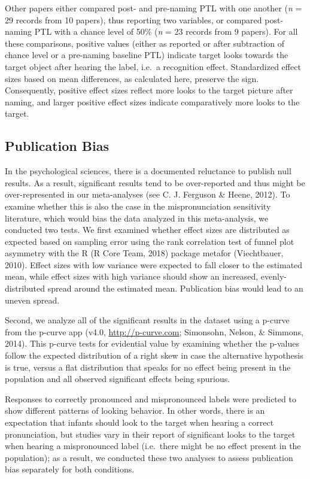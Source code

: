 \documentclass[man]{apa6}
\theoremstyle{definition}
\theoremstyle{definition}
\theoremstyle{definition}
\theoremstyle{remark}
\begin{document}
Other papers either compared post- and pre-naming PTL with one another
(\emph{n} = 29 records from 10 papers), thus reporting two variables, or
compared post-naming PTL with a chance level of 50\% (\emph{n} = 23
records from 9 papers). For all these comparisons, positive values
(either as reported or after subtraction of chance level or a pre-naming
baseline PTL) indicate target looks towards the target object after
hearing the label, i.e.~a recognition effect. Standardized effect sizes
based on mean differences, as calculated here, preserve the sign.
Consequently, positive effect sizes reflect more looks to the target
picture after naming, and larger positive effect sizes indicate
comparatively more looks to the target.

\subsection{Publication Bias}\label{publication-bias}

In the psychological sciences, there is a documented reluctance to
publish null results. As a result, significant results tend to be
over-reported and thus might be over-represented in our meta-analyses
(see C. J. Ferguson \& Heene, 2012). To examine whether this is also the
case in the mispronunciation sensitivity literature, which would bias
the data analyzed in this meta-analysis, we conducted two tests. We
first examined whether effect sizes are distributed as expected based on
sampling error using the rank correlation test of funnel plot asymmetry
with the R (R Core Team, 2018) package metafor (Viechtbauer, 2010).
Effect sizes with low variance were expected to fall closer to the
estimated mean, while effect sizes with high variance should show an
increased, evenly-distributed spread around the estimated mean.
Publication bias would lead to an uneven spread.

Second, we analyze all of the significant results in the dataset using a
p-curve from the p-curve app (v4.0, \url{http://p-curve.com}; Simonsohn,
Nelson, \& Simmons, 2014). This p-curve tests for evidential value by
examining whether the p-values follow the expected distribution of a
right skew in case the alternative hypothesis is true, versus a flat
distribution that speaks for no effect being present in the population
and all observed significant effects being spurious.

Responses to correctly pronounced and mispronounced labels were
predicted to show different patterns of looking behavior. In other
words, there is an expectation that infants should look to the target
when hearing a correct pronunciation, but studies vary in their report
of significant looks to the target when hearing a mispronounced label
(i.e.~there might be no effect present in the population); as a result,
we conducted these two analyses to assess publication bias separately
for both conditions.
\end{document}
